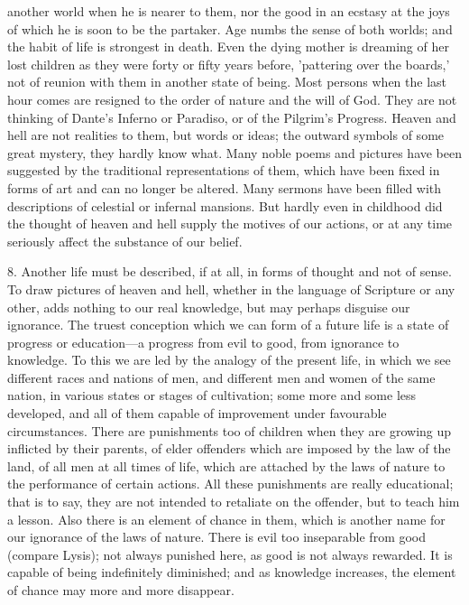 \documentclass[11pt,letter]{article}
\begin{document}
another world when he is nearer to them, nor the good in an ecstasy at the joys of which he is soon to be the partaker. Age numbs the sense of both worlds; and the habit of life is strongest in death. Even the dying mother is dreaming of her lost children as they were forty or fifty years before, 'pattering over the boards,' not of reunion with them in another state of being. Most persons when the last hour comes are resigned to the order of nature and the will of God. They are not thinking of Dante's Inferno or Paradiso, or of the Pilgrim's Progress. Heaven and hell are not realities to them, but words or ideas; the outward symbols of some great mystery, they hardly know what. Many noble poems and pictures have been suggested by the traditional representations of them, which have been fixed in forms of art and can no longer be altered. Many sermons have been filled with descriptions of celestial or infernal mansions. But hardly even in childhood did the thought of heaven and hell supply the motives of our actions, or at any time seriously affect the substance of our belief.

\par  8. Another life must be described, if at all, in forms of thought and not of sense. To draw pictures of heaven and hell, whether in the language of Scripture or any other, adds nothing to our real knowledge, but may perhaps disguise our ignorance. The truest conception which we can form of a future life is a state of progress or education—a progress from evil to good, from ignorance to knowledge. To this we are led by the analogy of the present life, in which we see different races and nations of men, and different men and women of the same nation, in various states or stages of cultivation; some more and some less developed, and all of them capable of improvement under favourable circumstances. There are punishments too of children when they are growing up inflicted by their parents, of elder offenders which are imposed by the law of the land, of all men at all times of life, which are attached by the laws of nature to the performance of certain actions. All these punishments are really educational; that is to say, they are not intended to retaliate on the offender, but to teach him a lesson. Also there is an element of chance in them, which is another name for our ignorance of the laws of nature. There is evil too inseparable from good (compare Lysis); not always punished here, as good is not always rewarded. It is capable of being indefinitely diminished; and as knowledge increases, the element of chance may more and more disappear.
\end{document}
